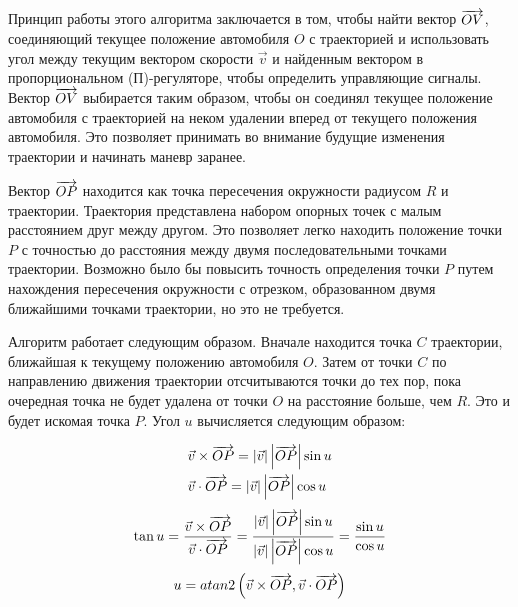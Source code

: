 Принцип работы этого алгоритма заключается в том, чтобы найти вектор $\overrightarrow{OV}$, соединяющий текущее положение
автомобиля $O$ с траекторией и использовать угол между текущим вектором скорости $\vec{v}$ и найденным вектором в
пропорциональном (П)-регуляторе, чтобы определить управляющие сигналы. Вектор $\overrightarrow{OV}$ выбирается таким образом,
чтобы он соединял текущее положение автомобиля с траекторией на неком удалении вперед от текущего положения автомобиля.
Это позволяет принимать во внимание будущие изменения траектории и начинать маневр заранее.

Вектор $\overrightarrow{OP}$ находится как точка пересечения окружности радиусом $R$ и траектории. Траектория представлена набором
опорных точек с малым расстоянием друг между другом. Это позволяет легко находить положение точки $P$ с точностью до
расстояния между двумя последовательными точками траектории. Возможно было бы повысить точность определения точки $P$
путем нахождения пересечения окружности с отрезком, образованном двумя ближайшими точками траектории, но это не
требуется.

Алгоритм работает следующим образом. Вначале находится точка $C$ траектории, ближайшая к текущему положению автомобиля
$O$. Затем от точки $C$ по направлению движения траектории отсчитываются точки до тех пор, пока очередная точка не будет
удалена от точки $O$ на расстояние больше, чем $R$. Это и будет искомая точка $P$. Угол $u$ вычисляется следующим
образом:

\begin{align}
    &\vec{v}\times\overrightarrow{OP} = \left|\vec{v}\right|\left|\overrightarrow{OP}\right|\sin u \\
    &\vec{v}\cdot \overrightarrow{OP} = \left|\vec{v}\right|\left|\overrightarrow{OP}\right|\cos u \\
\end{align}
\begin{equation}
    \tan u  = \frac{\vec{v}\times\overrightarrow{OP}}{\vec{v}\cdot \overrightarrow{OP}} =
              \frac{\left|\vec{v}\right|\left|\overrightarrow{OP}\right|\sin u}
                   {\left|\vec{v}\right|\left|\overrightarrow{OP}\right|\cos u} =
              \frac{\sin u}{\cos u} \\
\end{equation}
\begin{equation}
    u = atan2 \left(\vec{v}\times\overrightarrow{OP}, \vec{v}\cdot\overrightarrow{OP}\right)
\end{equation}


